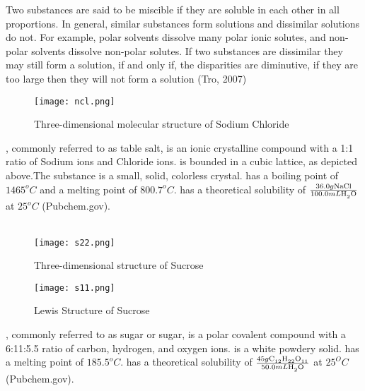 \documentclass{article}
\begin{document}
Two substances are said to be miscible if they are soluble in each other in all proportions. In general, similar substances form solutions and dissimilar solutions do not. For example, polar solvents dissolve many polar ionic solutes, and non-polar solvents dissolve non-polar solutes. If two substances are dissimilar they may still form a solution, if and only if, the disparities are diminutive, if they are too large then they will not form a solution (Tro, 2007)
\begin{figure}[H]
	\centering 
	\texttt{[image: ncl.png]}
	\caption{Three-dimensional molecular structure of Sodium Chloride}
\end{figure}
, commonly referred to as table salt, is an ionic crystalline compound with a 1:1 ratio of Sodium ions and Chloride ions.  is bounded in a cubic lattice, as depicted above.The substance is a small, solid, colorless crystal.  has a boiling point of $1465^o C$ and a melting point of $800.7^o C$.  has a theoretical solubility of $\frac{36.0g \ce{NaCl}}{100.0mL \ce{H_2O}}$ at $25^o C$ (Pubchem.gov). \\\\
\begin{figure}[H]
	\centering
	\texttt{[image: s22.png]}
	\caption{Three-dimensional structure of Sucrose}
\end{figure} 

\begin{figure}[H]
	\centering
	\texttt{[image: s11.png]}
	\caption{Lewis Structure of Sucrose}
	\end{figure}
, commonly referred to as sugar or sugar, is a polar covalent compound with a 6:11:5.5 ratio of  carbon, hydrogen, and oxygen ions.  is a white powdery solid.  has a melting point of $185.5^o C$.  has a theoretical solubility of $\frac{45g \ce{C_{12}H_{22}O_{11}}}{50.0mL \ce{H_2O}}$ at $25^O C$ (Pubchem.gov). \\\\
\end{document}
